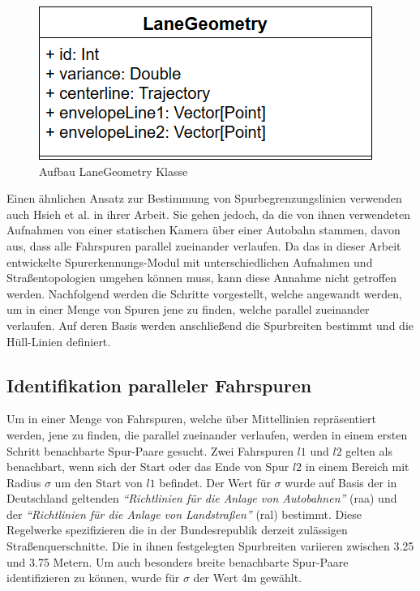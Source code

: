 \begin{figure}[H]
    \centering
    \includegraphics[width=0.38\linewidth]{resources/img/umsetzung/U2/LaneGeometry_ClassDia}
    \caption{Aufbau LaneGeometry Klasse}
    \label{fig:real2_laneGeometry_ClassDia}
\end{figure}

Einen ähnlichen Ansatz zur Bestimmung von Spurbegrenzungslinien verwenden auch Hsieh et al. in ihrer Arbeit.
Sie gehen jedoch, da die von ihnen verwendeten
Aufnahmen von einer statischen Kamera über einer Autobahn stammen, davon aus, dass alle Fahrspuren parallel
zueinander verlaufen. Da das in dieser Arbeit entwickelte Spurerkennungs-Modul mit unterschiedlichen
Aufnahmen und Straßentopologien umgehen können muss, kann diese Annahme nicht getroffen werden.
Nachfolgend werden die Schritte vorgestellt, welche angewandt werden, um in einer Menge von Spuren
jene zu finden, welche parallel zueinander verlaufen. Auf deren Basis werden anschließend die Spurbreiten bestimmt und
die Hüll-Linien definiert.

\subsection*{Identifikation paralleler Fahrspuren}
\label{sec:real2_identify_parallel_lanes}

Um in einer Menge von Fahrspuren, welche über Mittellinien repräsentiert werden, jene zu finden, die
parallel zueinander verlaufen, werden in einem ersten Schritt benachbarte Spur-Paare gesucht.
Zwei Fahrspuren $l1$ und $l2$ gelten als benachbart, wenn sich der Start oder das Ende
von Spur $l2$ in einem Bereich mit Radius $\sigma$ um den Start von $l1$ befindet.
Der Wert für $\sigma$ wurde auf Basis der in Deutschland geltenden
\textit{``Richtlinien für die Anlage von Autobahnen''} (\acrshort*{raa}) \cite[]{RAA2008}
und der \textit{``Richtlinien für die Anlage von Landstraßen''} (\acrshort*{ral}) \cite[]{RAL2012} bestimmt. Diese Regelwerke spezifizieren
die in der Bundesrepublik derzeit zulässigen Straßenquerschnitte. Die in ihnen festgelegten
Spurbreiten variieren zwischen 3.25 und 3.75 Metern.
Um auch besonders breite benachbarte Spur-Paare identifizieren zu können, wurde für $\sigma$ der Wert 4m gewählt.

